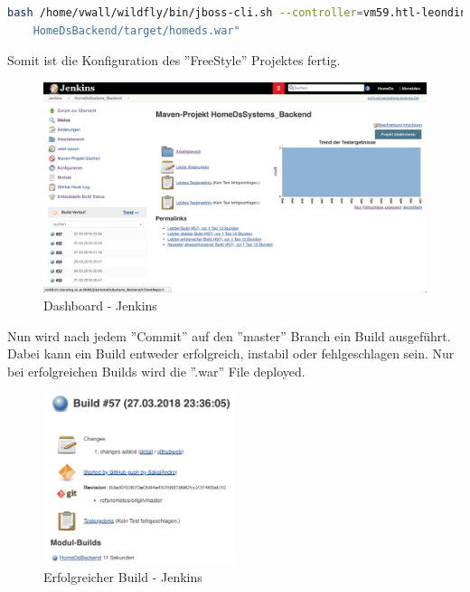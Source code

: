 \begin{lstlisting}[language=bash,caption={Deploy war-File},label={lst:deploy}]
bash /home/vwall/wildfly/bin/jboss-cli.sh --controller=vm59.htl-leonding.ac.at:9990 --connect -u=USER -p=PASSWORD --command="deploy --force /var/lib/jenkins/workspace/HomeDsSystems_Backend/
	HomeDsBackend/target/homeds.war"
\end{lstlisting}

Somit ist die Konfiguration des ''FreeStyle'' Projektes fertig.

\begin{figure}[H]
\centering
\includegraphics[width=1\textwidth]{images/09_CI/dashboard.png}
\caption{Dashboard - Jenkins}
\label{img:success}
\end{figure}

Nun wird nach jedem ''Commit'' auf den ''master'' Branch ein Build ausgeführt. Dabei kann ein Build entweder erfolgreich, instabil oder fehlgeschlagen sein. Nur bei erfolgreichen Builds wird die ''.war'' File deployed. 

\begin{figure}[H]
\centering
\includegraphics[width=0.5\textwidth]{images/09_CI/success.png}
\caption{Erfolgreicher Build - Jenkins}
\label{img:stable}
\end{figure}

